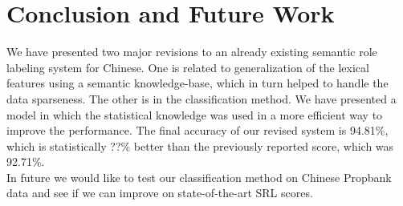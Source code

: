 \section{Conclusion and Future Work}
We have presented two major revisions to an already existing semantic role labeling system for Chinese. One is related to generalization of the lexical features using a semantic knowledge-base, which in turn helped to handle the data sparseness. The other is in the classification method. We have presented a model in which the statistical knowledge was used in a more efficient way to improve the performance. The final accuracy of our revised system is 94.81\%, which is statistically ??\% better than the previously reported score, which was 92.71\%.\\
In future we would like to test our classification method on Chinese Propbank data and see if we can improve on state-of-the-art SRL scores.   
